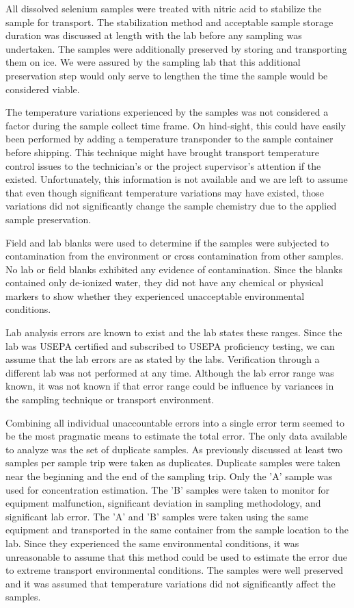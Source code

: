 \begin{linenumbers}
All dissolved selenium samples were treated with nitric acid to stabilize the sample for transport.  The stabilization method and acceptable sample storage duration was discussed at length with the lab before any sampling was undertaken.  The samples were additionally preserved by storing and transporting them on ice.  We were assured by the sampling lab that this additional preservation step would only serve to lengthen the time the sample would be considered viable.

The temperature variations experienced by the samples was not considered a factor during the sample collect time frame.  On hind-sight, this could have easily been performed by adding a temperature transponder to the sample container before shipping.  This technique might have brought transport temperature control issues to the technician's or the project supervisor's attention if the existed.  Unfortunately, this information is not available and we are left to assume that even though significant temperature variations may have existed, those variations did not significantly change the sample chemistry due to the applied sample preservation.

Field and lab blanks were used to determine if the samples were subjected to contamination from the environment or cross contamination from other samples.  No lab or field blanks exhibited any evidence of contamination.  Since the blanks contained only de-ionized water, they did not have any chemical or physical markers to show whether they experienced unacceptable environmental conditions.

Lab analysis errors are known to exist and the lab states these ranges.  Since the lab was USEPA certified and subscribed to USEPA proficiency testing, we can assume that the lab errors are as stated by the labs.  Verification through a different lab was not performed at any time.  Although the lab error range was known,  it was not known if that error range could be influence by variances in the sampling technique or transport environment.  

Combining all individual unaccountable errors into a single error term seemed to be the most pragmatic means to estimate the total error.  The only data available to analyze was the set of duplicate samples.  As previously discussed at least two samples per sample trip were taken as duplicates.  Duplicate samples were taken near the beginning and the end of the sampling trip.  Only the 'A' sample was used for concentration estimation.  The 'B' samples were taken to monitor for equipment malfunction, significant deviation in sampling methodology, and significant lab error.  The 'A' and 'B' samples were taken using the same equipment and transported in the same container from the sample location to the lab.  Since they experienced the same environmental conditions, it was unreasonable to assume that this method could be used to estimate the error due to extreme transport environmental conditions.  The samples were well preserved and it was assumed that temperature variations did not significantly affect the samples.  


\end{linenumbers}
